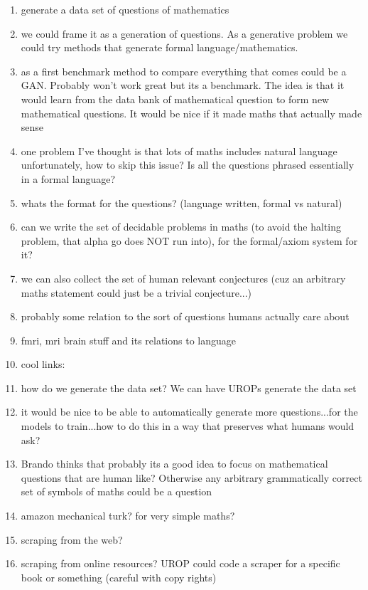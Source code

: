 \documentclass[11pt]{article}
\begin{document}
\begin{enumerate}
\item generate a data set of questions of mathematics
\item we could frame it as a generation of questions. As a generative problem we could try methods that generate formal language/mathematics.
\item as a first benchmark method to compare everything that comes could be a GAN. Probably won't work great but its a benchmark. The idea is that it would learn from the data bank of mathematical question to form new mathematical questions. It would be nice if it made maths that actually made sense
\item one problem I've thought is that lots of maths includes natural language unfortunately, how to skip this issue? Is all the questions phrased essentially in a formal language?
\item whats the format for the questions? (language written, formal vs natural)
\item can we write the set of decidable problems in maths (to avoid the halting problem, that alpha go does NOT run into), for the formal/axiom system for it?
\item we can also collect the set of human relevant conjectures (cuz an arbitrary maths statement could just be a trivial conjecture...)
\item probably some relation to the sort of questions humans actually care about
\item fmri, mri brain stuff and its relations to language
\item cool links: %
\item how do we generate the data set? We can have UROPs generate the data set
\item it would be nice to be able to automatically generate more questions...for the models to train...how to do this in a way that preserves what humans would ask?
\item Brando thinks that probably its a good idea to focus on mathematical questions that are human like? Otherwise any arbitrary grammatically correct set of symbols of maths could be a question
\item amazon mechanical turk? for very simple maths?
\item scraping from the web?
\item scraping from online resources? UROP could code a scraper for a specific book or something (careful with copy rights)

\end{enumerate}
\end{document}
